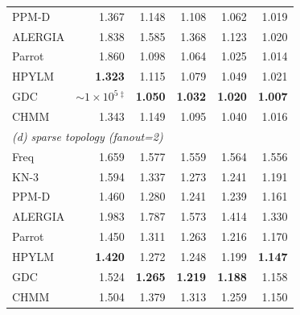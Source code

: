 \begin{table}[t]
\begin{tabular}{l r r r r r}
PPM-D   & 1.367          & 1.148          & 1.108          & 1.062          & 1.019          \\
ALERGIA & 1.838          & 1.585          & 1.368          & 1.123          & 1.020          \\
Parrot  & 1.860          & 1.098          & 1.064          & 1.025          & 1.014          \\
HPYLM   & \textbf{1.323} & 1.115          & 1.079          & 1.049          & 1.021          \\
GDC     & $\sim1{\times}10^{5}$\,$^\ddagger$ & \textbf{1.050} & \textbf{1.032} & \textbf{1.020} & \textbf{1.007} \\
CHMM    & 1.343          & 1.149          & 1.095          & 1.040          & 1.016          \\
\midrule
\multicolumn{6}{l}{\emph{(d) sparse topology (fanout=2)}} \\
Freq    & 1.659          & 1.577          & 1.559          & 1.564          & 1.556          \\
KN-3    & 1.594          & 1.337          & 1.273          & 1.241          & 1.191          \\
PPM-D   & 1.460          & 1.280          & 1.241          & 1.239          & 1.161          \\
ALERGIA & 1.983          & 1.787          & 1.573          & 1.414          & 1.330          \\
Parrot  & 1.450          & 1.311          & 1.263          & 1.216          & 1.170          \\
HPYLM   & \textbf{1.420} & 1.272          & 1.248          & 1.199          & \textbf{1.147} \\
GDC     & 1.524          & \textbf{1.265} & \textbf{1.219} & \textbf{1.188} & 1.158          \\
CHMM    & 1.504          & 1.379          & 1.313          & 1.259          & 1.150          \\
\bottomrule
\end{tabular}
\end{table}


